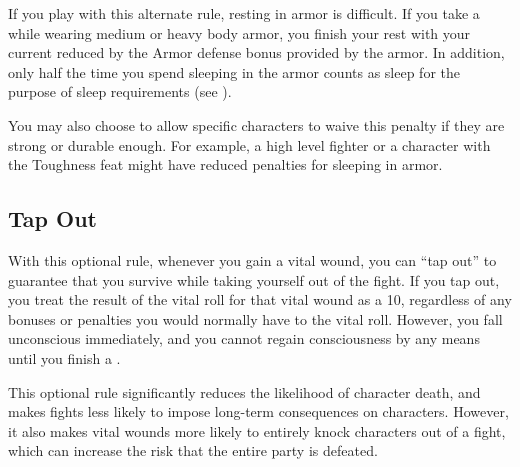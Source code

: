     If you play with this alternate rule, resting in armor is difficult.
    If you take a  while wearing medium or heavy body armor, you finish your rest with your current  reduced by the Armor defense bonus provided by the armor.
    In addition, only half the time you spend sleeping in the armor counts as sleep for the purpose of sleep requirements (see ).

    You may also choose to allow specific characters to waive this penalty if they are strong or durable enough.
    For example, a high level fighter or a character with the Toughness feat might have reduced penalties for sleeping in armor.

  \subsection{Tap Out}
    With this optional rule, whenever you gain a vital wound, you can ``tap out'' to guarantee that you survive while taking yourself out of the fight.
    If you tap out, you treat the result of the vital roll for that vital wound as a 10, regardless of any bonuses or penalties you would normally have to the vital roll.
    However, you fall unconscious immediately, and you cannot regain consciousness by any means until you finish a .

    This optional rule significantly reduces the likelihood of character death, and makes fights less likely to impose long-term consequences on characters.
    However, it also makes vital wounds more likely to entirely knock characters out of a fight, which can increase the risk that the entire party is defeated.
